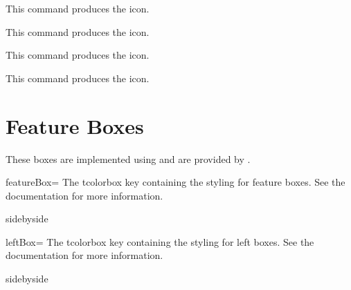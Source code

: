 \documentclass[article,ariandor]{plotweaver}
\begin{document}
\begin{docCommand}[
    doc name        = elsecaller,
    doc description = { \elsecaller },
    doc parameter   = \oarg{scale}\oarg{color},
    doc new     = 2026-08-29,
  ]{}{}
  This command produces the \elsecaller icon.
\end{docCommand}

\begin{docCommand}[
    doc name        = willshaper,
    doc description = { \willshaper },
    doc parameter   = \oarg{scale}\oarg{color},
    doc new     = 2026-08-29,
  ]{}{}
  This command produces the \willshaper icon.
\end{docCommand}

\begin{docCommand}[
    doc name        = stoneward,
    doc description = { \stoneward },
    doc parameter   = \oarg{scale}\oarg{color},
    doc new     = 2026-08-29,
  ]{}{}
  This command produces the \stoneward icon.
\end{docCommand}

\begin{docCommand}[
    doc name        = bondsmith,
    doc description = { \bondsmith },
    doc parameter   = \oarg{scale}\oarg{color},
    doc new     = 2026-08-29,
  ]{}{}
  This command produces the \bondsmith icon.
\end{docCommand}

\section{Feature Boxes}
These boxes are implemented using  and are provided by . 

\begin{docKey}[tcb][doc updated = 2026-08-16]{featureBox}{=}{}
  The tcolorbox key containing the styling for feature boxes. See the  documentation for more information. 
  \begin{dispExample*}{sidebyside}
  \begin{tcolorbox}[featureBox, title={Feature Box}]
      \lipsum[1][1-3]
  \end{tcolorbox}
  \end{dispExample*}
\end{docKey}

\begin{docKey}[tcb][doc updated = 2026-08-16]{leftBox}{=}{}
  The tcolorbox key containing the styling for left boxes. See the  documentation for more information. 
  \begin{dispExample*}{sidebyside}
  \begin{tcolorbox}[leftBox, title={Left Box}]
      \lipsum[1][1]
  \end{tcolorbox}
  \end{dispExample*}
\end{docKey}
\end{document}
